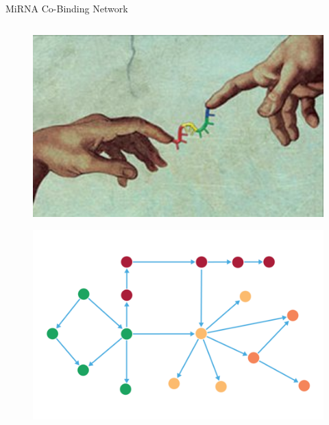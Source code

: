 \documentclass{beamer}
\begin{document}
\begin{frame}{MiRNA Co-Binding Network}
	\begin{columns}
		\begin{column}[t]{.48\textwidth}
			\begin{figure}[ht]
				\centering
				\includegraphics[width=1\textwidth]{img/mirna-cobinding.jpg}
				\caption*{\label{fig:mirna-cobinding}}
			\end{figure}
			\vspace{-1.5cm}
			\begin{figure}[ht]
				\centering
				\includegraphics[width=1\textwidth]{img/directed.png}
				\caption*{\label{fig:directed}}
			\end{figure}
		\end{column}


\end{columns}
\end{frame}
\end{document}
